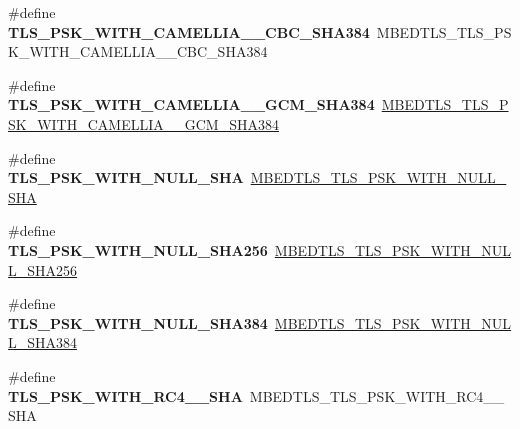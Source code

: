 \begin{DoxyCompactItemize}
\item 
\mbox{\label{compat-1_83_8h_af1841cd84f8c066c52384eab511b9ddc}} 
\#define {\bfseries T\+L\+S\+\_\+\+P\+S\+K\+\_\+\+W\+I\+T\+H\+\_\+\+C\+A\+M\+E\+L\+L\+I\+A\+\_\+\_\+\+C\+B\+C\+\_\+\+S\+H\+A384}~M\+B\+E\+D\+T\+L\+S\+\_\+\+T\+L\+S\+\_\+\+P\+S\+K\+\_\+\+W\+I\+T\+H\+\_\+\+C\+A\+M\+E\+L\+L\+I\+A\+\_\+\_\+\+C\+B\+C\+\_\+\+S\+H\+A384
\item 
\mbox{\label{compat-1_83_8h_a3c28fbf514a1eb42b0bd1a04b33af96c}} 
\#define {\bfseries T\+L\+S\+\_\+\+P\+S\+K\+\_\+\+W\+I\+T\+H\+\_\+\+C\+A\+M\+E\+L\+L\+I\+A\+\_\+\_\+\+G\+C\+M\+\_\+\+S\+H\+A384}~\mbox{\hyperlink{ssl__ciphersuites_8h_ae49e849e3aadebb2cfc455f990a613a2}{M\+B\+E\+D\+T\+L\+S\+\_\+\+T\+L\+S\+\_\+\+P\+S\+K\+\_\+\+W\+I\+T\+H\+\_\+\+C\+A\+M\+E\+L\+L\+I\+A\+\_\+\_\+\+G\+C\+M\+\_\+\+S\+H\+A384}}
\item 
\mbox{\label{compat-1_83_8h_a2d0cb190aceb6aaa99890d50f34f2256}} 
\#define {\bfseries T\+L\+S\+\_\+\+P\+S\+K\+\_\+\+W\+I\+T\+H\+\_\+\+N\+U\+L\+L\+\_\+\+S\+HA}~\mbox{\hyperlink{ssl__ciphersuites_8h_a29a1417a6a370fea39af2574331049ea}{M\+B\+E\+D\+T\+L\+S\+\_\+\+T\+L\+S\+\_\+\+P\+S\+K\+\_\+\+W\+I\+T\+H\+\_\+\+N\+U\+L\+L\+\_\+\+S\+HA}}
\item 
\mbox{\label{compat-1_83_8h_a3a85a0a04a84b48f41a7a4f11b820189}} 
\#define {\bfseries T\+L\+S\+\_\+\+P\+S\+K\+\_\+\+W\+I\+T\+H\+\_\+\+N\+U\+L\+L\+\_\+\+S\+H\+A256}~\mbox{\hyperlink{ssl__ciphersuites_8h_a02fd01670af3ffa7207c996ccf52ee1f}{M\+B\+E\+D\+T\+L\+S\+\_\+\+T\+L\+S\+\_\+\+P\+S\+K\+\_\+\+W\+I\+T\+H\+\_\+\+N\+U\+L\+L\+\_\+\+S\+H\+A256}}
\item 
\mbox{\label{compat-1_83_8h_a65af775defd772ada691c84a21318036}} 
\#define {\bfseries T\+L\+S\+\_\+\+P\+S\+K\+\_\+\+W\+I\+T\+H\+\_\+\+N\+U\+L\+L\+\_\+\+S\+H\+A384}~\mbox{\hyperlink{ssl__ciphersuites_8h_a4e1d2aae46aeeba5a32ef8737763a5e8}{M\+B\+E\+D\+T\+L\+S\+\_\+\+T\+L\+S\+\_\+\+P\+S\+K\+\_\+\+W\+I\+T\+H\+\_\+\+N\+U\+L\+L\+\_\+\+S\+H\+A384}}
\item 
\mbox{\label{compat-1_83_8h_afc886bab77fa689b1bff975db1f07ee0}} 
\#define {\bfseries T\+L\+S\+\_\+\+P\+S\+K\+\_\+\+W\+I\+T\+H\+\_\+\+R\+C4\+\_\+\_\+\+S\+HA}~M\+B\+E\+D\+T\+L\+S\+\_\+\+T\+L\+S\+\_\+\+P\+S\+K\+\_\+\+W\+I\+T\+H\+\_\+\+R\+C4\+\_\+\_\+\+S\+HA

\end{DoxyCompactItemize}
